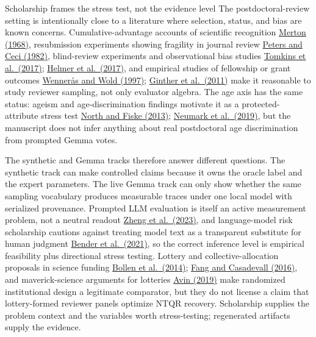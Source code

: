 \documentclass[
  ignorenonframetext,
]{beamer}
\begin{document}
\begin{frame}[allowframebreaks]{Scholarship frames the stress test, not
the evidence level}
\protect{}\label{scholarship-frames-the-stress-test-not-the-evidence-level}
The postdoctoral-review setting is intentionally close to a literature
where selection, status, and bias are known concerns.
Cumulative-advantage accounts of scientific recognition
\href{https://doi.org/10.1126/science.159.3810.56}{Merton (1968)},
resubmission experiments showing fragility in journal review
\href{https://doi.org/10.1017/S0140525X00011183}{Peters and Ceci
(1982)}, blind-review experiments and observational bias studies
\href{https://doi.org/10.1073/pnas.1707323114}{Tomkins et al.~(2017)};
\href{https://doi.org/10.7554/eLife.21718}{Helmer et al.~(2017)}, and
empirical studies of fellowship or grant outcomes
\href{https://doi.org/10.1038/387341a0}{Wennerås and Wold (1997)};
\href{https://doi.org/10.1126/science.1196783}{Ginther et al.~(2011)}
make it reasonable to study reviewer sampling, not only evaluator
algebra. The age axis has the same status: ageism and age-discrimination
findings motivate it as a protected-attribute stress test
\href{https://doi.org/10.1177/0146167213480043}{North and Fiske (2013)};
\href{https://doi.org/10.1086/701029}{Neumark et al.~(2019)}, but the
manuscript does not infer anything about real postdoctoral age
discrimination from prompted Gemma votes.

The synthetic and Gemma tracks therefore answer different questions. The
synthetic track can make controlled claims because it owns the oracle
label and the expert parameters. The live Gemma track can only show
whether the same sampling vocabulary produces measurable traces under
one local model with serialized provenance. Prompted LLM evaluation is
itself an active measurement problem, not a neutral readout
\href{https://arxiv.org/abs/2306.05685}{Zheng et al.~(2023)}, and
language-model risk scholarship cautions against treating model text as
a transparent substitute for human judgment
\href{https://doi.org/10.1145/3442188.3445922}{Bender et al.~(2021)}, so
the correct inference level is empirical feasibility plus directional
stress testing. Lottery and collective-allocation proposals in science
funding \href{https://doi.org/10.1002/embr.201338068}{Bollen et
al.~(2014)}; \href{https://doi.org/10.1128/mBio.00422-16}{Fang and
Casadevall (2016)}, and maverick-science arguments for lotteries
\href{https://doi.org/10.1016/j.shpsa.2018.11.006}{Avin (2019)} make
randomized institutional design a legitimate comparator, but they do not
license a claim that lottery-formed reviewer panels optimize NTQR
recovery. Scholarship supplies the problem context and the variables
worth stress-testing; regenerated artifacts supply the evidence.


\end{frame}
\end{document}
